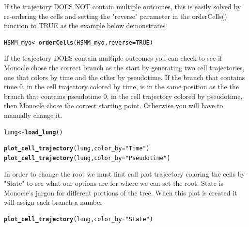 \documentclass[10pt,oneside]{article}\usepackage[]{graphicx}\usepackage[]{color}
\makeatletter
\newcommand{\hlnum}[1]{\textcolor[rgb]{0.686,0.059,0.569}{#1}}%
\newcommand{\hlstr}[1]{\textcolor[rgb]{0.192,0.494,0.8}{#1}}%
\newcommand{\hlstd}[1]{\textcolor[rgb]{0.345,0.345,0.345}{#1}}%
\newcommand{\hlkwb}[1]{\textcolor[rgb]{0.69,0.353,0.396}{#1}}%
\newcommand{\hlkwc}[1]{\textcolor[rgb]{0.333,0.667,0.333}{#1}}%
\newcommand{\hlkwd}[1]{\textcolor[rgb]{0.737,0.353,0.396}{\textbf{#1}}}%
\newenvironment{kframe}{%
 \def\at@end@of@kframe{}%
 \ifinner\ifhmode%
  \def\at@end@of@kframe{\end{minipage}}%
  \begin{minipage}{\columnwidth}%
 \fi\fi%
 \def\FrameCommand##1{\hskip\@totalleftmargin \hskip-\fboxsep
 \colorbox{shadecolor}{##1}\hskip-\fboxsep
     \hskip-\linewidth \hskip-\@totalleftmargin \hskip\columnwidth}%
 \MakeFramed {\advance\hsize-\width
   \@totalleftmargin\z@ \linewidth\hsize
   \@setminipage}}%
 {\par\unskip\endMakeFramed%
 \at@end@of@kframe}
\newenvironment{knitrout}{}{} %
\makeatother
\begin{document}
\begin{enumerate}
 If the trajectory DOES NOT contain multiple outcomes, this is easily solved by re-ordering the cells and setting the "reverse" parameter in the orderCells() function to TRUE as the example below demonstrates
\begin{knitrout}
\color{fgcolor}\begin{kframe}
\begin{alltt}
\hlstd{HSMM_myo} \hlkwb{<-} \hlkwd{orderCells}\hlstd{(HSMM_myo,} \hlkwc{reverse} \hlstd{=} \hlnum{TRUE}\hlstd{)}
\end{alltt}
\end{kframe}
\end{knitrout}
 
 If the trajectory DOES contain multiple outcomes you can check to see if Monocle chose the correct branch as the start by generating two cell trajectories, one that colors by time and the other by pseudotime. If the branch that contains time 0, in the cell trajectory colored by time, is in the same position as the the branch that contains pseudotime 0, in the cell trajectory colored by pseudotime, then Monocle chose the correct starting point. Otherwise you will have to manually change it.   
\begin{knitrout}
\color{fgcolor}\begin{kframe}
\begin{alltt}
\hlstd{lung} \hlkwb{<-} \hlkwd{load_lung}\hlstd{()}

\hlkwd{plot_cell_trajectory}\hlstd{(lung,} \hlkwc{color_by} \hlstd{=} \hlstr{"Time"}\hlstd{)}
\hlkwd{plot_cell_trajectory}\hlstd{(lung,} \hlkwc{color_by} \hlstd{=} \hlstr{"Pseudotime"}\hlstd{)}
\end{alltt}
\end{kframe}
\end{knitrout}
 
 In order to change the root we must first call plot trajectory coloring the cells by "State" to see what our options are for where we can set the root. State is Monocle's jargon for different portions of the tree. When this plot is created it will assign each branch a number
\begin{knitrout}
\color{fgcolor}\begin{kframe}
\begin{alltt}
\hlkwd{plot_cell_trajectory}\hlstd{(lung,} \hlkwc{color_by} \hlstd{=} \hlstr{"State"}\hlstd{)}
\end{alltt}
\end{kframe}
\end{knitrout}
 

\end{enumerate}
\end{document}
